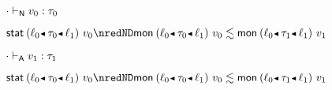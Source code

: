 {\begin{lamportproof*}
    \begin{pfproof}
      \absurdstep
        \begin{pfproof}
          ${\cdot} \vdash_{\mathsf{N}} v_0 : \tau_0$
        \end{pfproof}
    \end{pfproof}

    \begin{pfproof}
      \qedstep
        \begin{pfproof}
          $\estab{\obnd{\sowner_0}{\stype_0}{\sowner_1}}{\svalue_0} \nredND \rexpr{\emon{\obnd{\sowner_0}{\stype_0}{\sowner_1}}{\svalue_0}}{\emon{\obnd{\sowner_0}{\stype_1}{\sowner_1}}{\svalue_1}}$
        \end{pfproof}
    \end{pfproof}

    \begin{pfproof}
      \absurdstep
        \begin{pfproof}
          ${\cdot} \vdash_{\mathsf{A}} v_1 : \tau_1$
        \end{pfproof}
    \end{pfproof}

    \begin{pfproof}
      \qedstep
        \begin{pfproof}
          $\estab{\obnd{\sowner_0}{\stype_0}{\sowner_1}}{\svalue_0} \nredND \rexpr{\emon{\obnd{\sowner_0}{\stype_0}{\sowner_1}}{\svalue_0}}{\emon{\obnd{\sowner_0}{\stype_1}{\sowner_1}}{\svalue_1}}$
        \end{pfproof}
    \end{pfproof}

\end{lamportproof*}}

